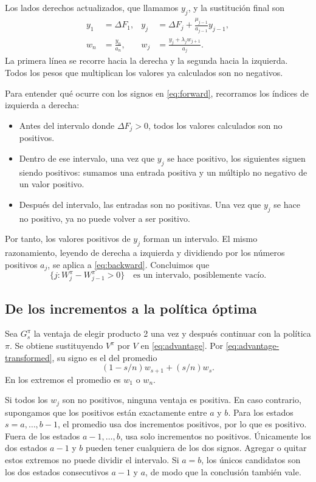 \documentclass[11pt,a4paper]{article}
\begin{document}
Los lados derechos actualizados, que llamamos $y_j$, y la sustitución
final son
\begin{align}
y_1&=\Delta F_1,
&y_j&=\Delta F_j+\frac{\mu_{j-1}}{a_{j-1}}y_{j-1},
\label{eq:forward}\\
w_n&=\frac{y_n}{a_n},
&w_j&=\frac{y_j+\lambda_jw_{j+1}}{a_j}.
\label{eq:backward}
\end{align}
La primera línea se recorre hacia la derecha y la segunda hacia la
izquierda. Todos los pesos que multiplican los valores ya calculados
son no negativos.

Para entender qué ocurre con los signos en \eqref{eq:forward},
recorramos los índices de izquierda a derecha:
\begin{itemize}
\item Antes del intervalo donde $\Delta F_j>0$, todos los valores
calculados son no positivos.
\item Dentro de ese intervalo, una vez que $y_j$ se hace positivo,
los siguientes siguen siendo positivos: sumamos una entrada positiva
y un múltiplo no negativo de un valor positivo.
\item Después del intervalo, las entradas son no positivas.
Una vez que $y_j$ se hace no positivo, ya no puede volver a ser positivo.
\end{itemize}
Por tanto, los valores positivos de $y_j$ forman un intervalo. El
mismo razonamiento, leyendo de derecha a izquierda y dividiendo por
los números positivos $a_j$, se aplica a \eqref{eq:backward}.
Concluimos que
\begin{equation}
\{j:W_j^\pi-W_{j-1}^\pi>0\}
\quad\text{es un intervalo, posiblemente vacío.}
\label{eq:positive-W}
\end{equation}

\subsection{De los incrementos a la política óptima}
\label{sec:greedy-interval}

Sea $G_s^\pi$ la ventaja de elegir producto 2 una vez y después
continuar con la política $\pi$. Se obtiene sustituyendo $V^\pi$
por $V$ en \eqref{eq:advantage}. Por
\eqref{eq:advantage-transformed}, su signo es el del promedio
\[
(1-s/n)w_{s+1}+(s/n)w_s.
\]
En los extremos el promedio es $w_1$ o $w_n$.

Si todos los $w_j$ son no positivos, ninguna ventaja es positiva.
En caso contrario, supongamos que los positivos están exactamente
entre $a$ y $b$. Para los estados $s=a,\ldots,b-1$, el promedio
usa dos incrementos positivos, por lo que es positivo. Fuera de los
estados $a-1,\ldots,b$, usa solo incrementos no positivos. Únicamente
los dos estados $a-1$ y $b$ pueden tener cualquiera de los dos signos.
Agregar o quitar estos extremos no puede dividir el intervalo.
Si $a=b$, los únicos candidatos son los dos estados consecutivos
$a-1$ y $a$, de modo que la conclusión también vale.
\end{document}
